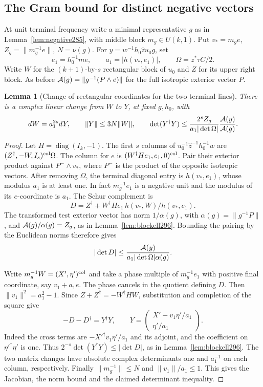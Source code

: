 \documentclass[a4paper,11pt]{article}
\newtheorem{lemma}[proposition]{Lemma}
\theoremstyle{definition}
\theoremstyle{remark}
\numberwithin{equation}{section}
\begin{document}
\subsection{The Gram bound for distinct negative vectors}\label{nav:VIII-56}
At unit terminal frequency write a minimal representative
\(g\) as in Lemma~\ref{lem:negative285}, with middle block
\(m_g\in U(k,1)\). Put \(v_*=m_ge\), \(Z_g=\|m_g^{-1}e\|\),
\(N=\nu(g)\). For \(y=w^{-1}h_0\widehat z u_0g\), set
\[
  e_1=h_0^{-1}me,\qquad a_1=|h(v_*,e_1)|,\qquad
             \Omega=z^*\tau C/2.
\]
Write \(W\) for the \((k+1)\)-by-\(s\) rectangular block
of \(u_0\) and \(Z\) for its upper right block. As before
\({\cal A}(g)=\|g^{-1}(P\wedge e)\|\) for the full isotropic
exterior vector \(P\).

\begin{lemma}[Change of rectangular coordinates for the two terminal lines]\leavevmode
\label{lem:twoneg299}
There is a complex linear change from \(W\) to \(Y\), at
fixed \(g,h_0\), with
\[
 dW=a_1^{2s}dY,\qquad \|Y\|\le3N\|W\|,\qquad
 \det(Y^\dagger Y)\le
    \frac{2^s Z_g}{a_1|\det\Omega|}
                     \frac{{\cal A}(y)}{{\cal A}(g)} .
\]
\end{lemma}
\begin{proof}
Let \(H=\operatorname{diag}(I_k,-1)\). The first \(s\)
columns of \(u_0^{-1}\widehat z^{-1}h_0^{-1}w\) are
\((Z^\dagger,-W,I_s)^{\rm col}\Omega\). The column
for \(e\) is \((W^\dagger H e_1,e_1,0)^{\rm col}\).
Pair their exterior product against \(P^-\wedge v_*\),
where \(P^-\) is the product of the opposite isotropic
vectors. After removing \(\Omega\), the terminal diagonal
entry is \(h(v_*,e_1)\), whose modulus \(a_1\) is at
least one. In fact \(m_g^{-1}e_1\) is a negative unit
and the modulus of its \(e\)-coordinate is \(a_1\).
The Schur complement is
\[
 D=Z^\dagger+
       W^\dagger H e_1\,h(v_*,W)/h(v_*,e_1).
\]
The transformed test exterior vector has norm
\(1/\alpha(g)\), with \(\alpha(g)=\|g^{-1}P\|\), and
\({\cal A}(g)/\alpha(g)=Z_g\), as in
Lemma~\ref{lem:blockell296}. Bounding the pairing by the
Euclidean norms therefore gives
\[
             |\det D|\le\frac{{\cal A}(y)}
                          {a_1|\det\Omega|\alpha(g)} .
\]

Write \(m_g^{-1}W=(X',\eta')^{\rm col}\) and take a phase
multiple of \(m_g^{-1}e_1\) with positive final coordinate,
say \(v_1+a_1e\). The phase cancels in the quotient defining
\(D\). Then \(\|v_1\|^2=a_1^2-1\). Since
\(Z+Z^\dagger=-W^\dagger H W\), substitution and completion
of the square give
\[
       -D-D^\dagger=Y^\dagger Y,\qquad
       Y=\begin{pmatrix}X'-v_1\eta'/a_1\\ \eta'/a_1\end{pmatrix}.
\]
Indeed the cross terms are
\(-X'^\dagger v_1\eta'/a_1\) and its adjoint, and the
coefficient on \(\eta'^\dagger\eta'\) is one.
Thus \(2^{-s}\det(Y^\dagger Y)\le|\det D|\), as in
Lemma~\ref{lem:blockell296}. The two matrix changes have
absolute complex determinants one and \(a_1^{-1}\) on
each column, respectively. Finally \(\|m_g^{-1}\|\le N\)
and \(\|v_1\|/a_1\le1\). This gives the Jacobian, the
norm bound and the claimed determinant inequality.
\end{proof}
\end{document}

